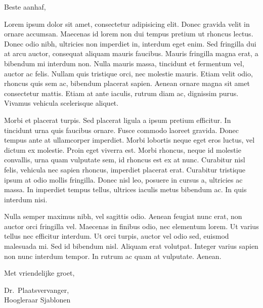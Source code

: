 \documentclass[11pt]{letter}
\date{January 1, 1970}
\begin{document}
\begin{letterhead}

 Beste aanhaf,

 Lorem ipsum dolor sit amet, consectetur adipisicing elit. Donec gravida velit in ornare accumsan. Maecenas id lorem non dui tempus pretium ut rhoncus lectus. Donec odio nibh, ultricies non imperdiet in, interdum eget enim. Sed fringilla dui at arcu auctor, consequat aliquam mauris faucibus. Mauris fringilla magna erat, a bibendum mi interdum non. Nulla mauris massa, tincidunt et fermentum vel, auctor ac felis. Nullam quis tristique orci, nec molestie mauris. Etiam velit odio, rhoncus quis sem ac, bibendum placerat sapien. Aenean ornare magna sit amet consectetur mattis. Etiam at ante iaculis, rutrum diam ac, dignissim purus. Vivamus vehicula scelerisque aliquet.

 Morbi et placerat turpis. Sed placerat ligula a ipsum pretium efficitur. In tincidunt urna quis faucibus ornare. Fusce commodo laoreet gravida. Donec tempus ante at ullamcorper imperdiet. Morbi lobortis neque eget eros luctus, vel dictum ex molestie. Proin eget viverra est. Morbi rhoncus, neque id molestie convallis, urna quam vulputate sem, id rhoncus est ex at nunc. Curabitur nisl felis, vehicula nec sapien rhoncus, imperdiet placerat erat. Curabitur tristique ipsum at odio mollis fringilla. Donec nisl leo, posuere in cursus a, ultricies ac massa. In imperdiet tempus tellus, ultrices iaculis metus bibendum ac. In quis interdum nisi.

 Nulla semper maximus nibh, vel sagittis odio. Aenean feugiat nunc erat, non auctor orci fringilla vel. Maecenas in finibus odio, nec elementum lorem. Ut varius tellus nec efficitur interdum. Ut orci turpis, auctor vel odio sed, euismod malesuada mi. Sed id bibendum nisl. Aliquam erat volutpat. Integer varius sapien non nunc interdum tempor. In rutrum ac quam at vulputate. Aenean.

 Met vriendelijke groet,

 Dr.~Plaatsvervanger, \\ Hoogleraar Sjablonen

\end{letterhead}
\end{document}
